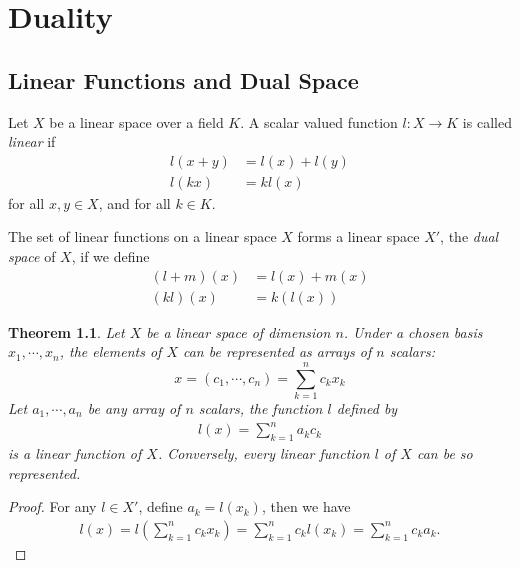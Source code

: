 \documentclass[11pt]{book}
\newtheorem{theorem}{Theorem}[section]
\theoremstyle{definition}
\numberwithin{equation}{subsection}
\begin{document}
\medskip





\chapter{Duality}
\section{Linear Functions and Dual Space}

Let $X$ be a linear space over a field $K$. A scalar valued function $l:X\to K$ is called \emph{linear} if 
\begin{align*}
    l(x+y) &= l(x) + l(y) \\
    l(kx) &= k l(x)
\end{align*}
for all $x,y\in X$, and for all $k\in K$.

The set of linear functions on a linear space $X$ forms a linear space $X'$, the \emph{dual space} of $X$, if we define 
\begin{align*}
    (l+m)(x) &= l(x) + m(x) \\
    (kl)(x) &= k(l(x))
\end{align*}

\medskip

\begin{theorem}\label{theorem_dual}
Let $X$ be a linear space of dimension $n$. Under a chosen basis $x_1,\cdots,x_n$, the elements of $X$ can be represented as arrays of $n$ scalars:
$$x = (c_1,\cdots,c_n) = \sum^n_{k=1}c_k x_k$$
Let $a_1,\cdots,a_n$ be any array of $n$ scalars, the function $l$ defined by
\begin{align*}
    l(x) = \sum^n_{k=1} a_k c_k
\end{align*}
is a linear function of $X$. Conversely, every linear function $l$ of $X$ can be so represented.
\end{theorem}
\begin{proof}
For any $l\in X'$, define $a_k = l(x_k)$, then we have 
\begin{align*}
    l(x) = l\left(\sum^n_{k=1}c_k x_k \right) = \sum^n_{k=1}c_k l(x_k) = \sum^n_{k=1}c_k a_k.
\end{align*}
\end{proof}

\medskip
\end{document}
